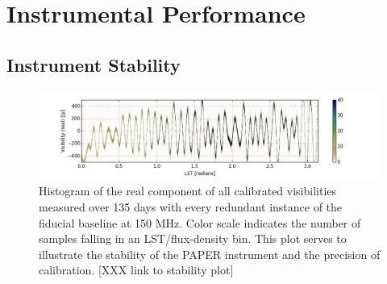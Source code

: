\documentclass[twocolumn,numberedappendix]{emulateapj} \shorttitle{PSA64}
\begin{document}

\section{Instrumental Performance}\label{sec:instrument}
\subsection{Instrument Stability}

\begin{figure}
\centering
\includegraphics[width=2.3\columnwidth]{plots/density.png}
\caption{Histogram of the real component of all calibrated visibilities
measured over 135 days with every redundant instance of the fiducial baseline at 150
MHz.  Color scale indicates the number of samples falling in an
LST/flux-density bin.  This plot serves to illustrate the stability of the
PAPER instrument and the precision of calibration.
[XXX link to stability plot]
}\label{fig:density}
\end{figure}
\end{document}
